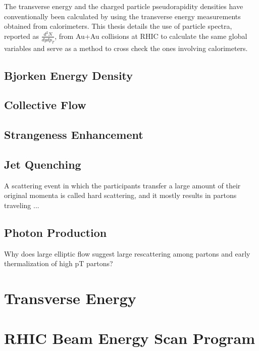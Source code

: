 The transverse energy and the charged particle pseudorapidity densities have conventionally been calculated by using the transverse energy measurements obtained from calorimeters. This thesis details the use of particle spectra, reported as $\frac{d^{2}N}{dydp_{T}}$, from Au+Au collisions at RHIC to calculate the same global variables and serve as a method to cross check the ones involving calorimeters.
\subsection{Bjorken Energy Density}
\subsection{Collective Flow}
\subsection{Strangeness Enhancement}
\subsection{Jet Quenching}
A scattering event in which the participants transfer a large amount of their original momenta is called hard scattering, and it mostly results in partons traveling ...
\subsection{Photon Production}
Why does large elliptic flow suggest large rescattering among partons and early thermalization of high pT partons? 
\section{Transverse Energy}
\section{RHIC Beam Energy Scan Program}
